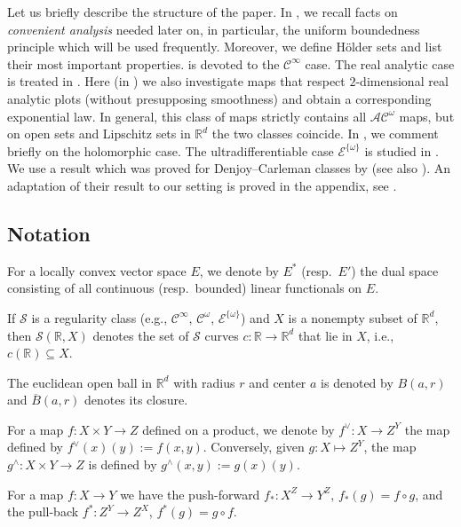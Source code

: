 \documentclass[10pt, reqno]{amsart}
\theoremstyle{plain}
\theoremstyle{definition}
\numberwithin{equation}{section}
\def\om{\omega}
\def\R{\mathbb{R}}
\def\cC{\mathcal{C}}
\def\cE{\mathcal{E}}
\def\cS{\mathcal{S}}
\renewcommand{\o}{\circ}
\def\ol{\overline}
\def\AA{\mathcal{AC}^\omega}
\begin{document}
Let us briefly describe the structure of the paper.
In , we recall facts on \emph{convenient analysis} needed later on, in particular, the uniform boundedness principle 
which will be used frequently. Moreover, we define H\"older sets and list their most important properties.
 is devoted to the $\cC^\infty$ case.
The real analytic case is treated in . 
Here (in ) we also investigate maps that respect $2$-dimensional real analytic plots (without presupposing smoothness) 
and obtain a corresponding exponential law. In general, this class of maps strictly contains all $\AA$ maps, but on open sets and Lipschitz sets 
in $\R^d$ the two classes coincide. In , we comment briefly on the holomorphic case.
The ultradifferentiable case $\cE^{\{\om\}}$ is studied in . 
We use a result which was proved for Denjoy--Carleman classes by \cite{BelottoBierstoneChow17} (see also \cite{ChaumatChollet99}).
An adaptation of their result to our setting is proved in the appendix, see .  


\subsection{Notation}
For a locally convex vector space $E$, we denote by $E^*$ (resp.\ $E'$) 
the dual space consisting of all continuous (resp.\ bounded) linear functionals on $E$. 

If $\cS$ is a regularity class (e.g., $\cC^\infty$, $\cC^\om$, $\cE^{\{\om\}}$) 
and $X$ is a nonempty subset of $\R^d$, then $\cS(\R,X)$ denotes the set of $\cS$ curves $c : \R \to \R^d$ 
that lie in $X$, i.e., $c(\R) \subseteq X$.

The euclidean open ball in $\R^d$ with radius $r$ and center $a$ is denoted by $B(a,r)$ 
and $\ol B(a,r)$ denotes its closure.

For a map $f : X \times Y \to Z$ defined on a product, we denote by $f^\vee : X \to Z^Y$ the map defined by 
$f^\vee(x)(y) := f(x,y)$. Conversely, given $g : X \mapsto Z^Y$, the map $g^\wedge : X \times Y \to Z$ is 
defined by $g^\wedge(x,y):= g(x)(y)$.

For a map $f : X \to Y$ we have the push-forward $f_* : X^Z \to Y^Z$, $f_*(g) = f \o g$, and the pull-back 
$f^* : Z^Y \to Z^X$, $f^*(g)=g \o f$. 
\end{document}
